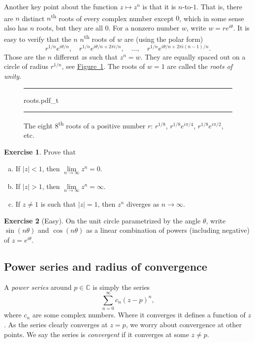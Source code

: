 \documentclass[12pt,openany]{book}
\newcommand{\sabs}[1]{\lvert {#1} \rvert}
\newcommand{\C}{{\mathbb{C}}}
\newcommand{\myindex}[1]{#1\index{#1}}
\theoremstyle{plain}
\theoremstyle{remark}
\theoremstyle{definition}
\newenvironment{exbox}{%
    \def\FrameCommand{\vrule width 1pt \relax\hspace{10pt}}%
    \MakeFramed{\advance\hsize-\width\FrameRestore}%
}{%
    \endMakeFramed
}
\newenvironment{exparts}{%
    \leavevmode\begin{enumerate}[a),noitemsep,topsep=0pt,parsep=0pt,partopsep=0pt]
}{%
    \end{enumerate}
}
\newenvironment{myfig}{%
\begin{figure}[h!t]
\noindent\rule{\textwidth}{0.5pt}\vspace{12pt}\par\centering}%
{\par\noindent\rule{\textwidth}{0.5pt}
\end{figure}}
\theoremstyle{exercise}
\newtheorem{exercise}{Exercise}[section]
\theoremstyle{example}
\newcommand{\figureref}[1]{\hyperref[#1]{Figure~\ref*{#1}}}
\begin{document}
Another key point about the function $z \mapsto z^n$ is that it is $n$-to-$1$.
That is, there are $n$ distinct $n$\textsuperscript{th} roots of every complex
number except $0$,
which in some sense also has $n$ roots, but they are all $0$.  For a nonzero
number $w$, write $w = re^{i\theta}$.  It is easy to verify that
the $n$ $n$\textsuperscript{th} roots of $w$ are 
(using the polar form)
\begin{equation*}
r^{1/n} e^{i\theta/n}
, \quad
r^{1/n} e^{i\theta/n + 2\pi i /n}
, \quad \ldots, \quad
r^{1/n} e^{i\theta/n + 2\pi i (n-1)/n} .
\end{equation*}
Those are the $n$ different $z$s such that $z^n=w$.  They are equally
spaced out on a circle of radius $r^{1/n}$, see
\figureref{fig:roots}.  The roots of $w=1$ are
called the \emph{\myindex{roots of unity}}.

\begin{myfig}
{roots.pdf_t}
\caption{The eight $8$\textsuperscript{th} roots of a positive number $r$:
$r^{1/8}$, $r^{1/8} e^{i \pi / 4}$,  $r^{1/8} e^{i \pi / 2}$,
etc.\label{fig:roots}}
\end{myfig}

\begin{exbox}
\begin{exercise}
Prove that
\begin{exparts}
\item
If $\sabs{z}<1$, then $\lim\limits_{n\to \infty} z^n = 0$.
\item
If $\sabs{z}>1$, then $\lim\limits_{n\to \infty} z^n = \infty$.
\item
If $z \not= 1$ is such that $\sabs{z}=1$, then $z^n$ diverges as $n \to
\infty$.
\end{exparts}
\end{exercise}

\begin{exercise}[Easy]
On the unit circle parametrized by the angle $\theta$,
write $\sin(n\theta)$ and $\cos(n\theta)$ as a linear combination
of powers (including negative) of $z = e^{i\theta}$.
\end{exercise}
\end{exbox}

\subsection{Power series and radius of convergence}

A \emph{\myindex{power series}} around $p \in \C$ is simply the series
%
\begin{equation*}
\sum_{n=0}^\infty c_n {(z-p)}^n ,
\end{equation*}
where $c_n$ are some complex numbers.  Where it converges it defines a
function of $z$.  As the series clearly converges at $z=p$, we worry about
convergence at other points.  We say the series is
\emph{convergent} if it converges at
some $z \not= p$.
\end{document}

